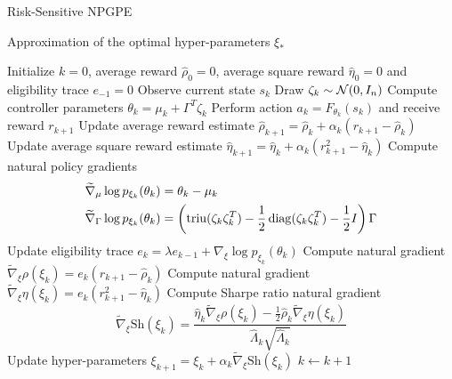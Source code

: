 \begin{algorithm}[t!]
	\caption{Risk-Sensitive NPGPE}
	\label{algo:RSNPGPE}
	\begin{algorithmic}[0]
		\Ensure Approximation of the optimal hyper-parameters $\xi_*$
		\begin{algorithmic}[1]
		\State Initialize $k = 0$, average reward $\widehat{\rho}_0 = 0$, average square reward $\widehat{\eta}_0 = 0$ and eligibility trace $e_{-1} = 0$
		\Repeat
			\State Observe current state $s_k$
			\State Draw $\zeta_k \sim \mathcal{N}(0, I_n)$
			\State Compute controller parameters $\theta_k = \mu_k + \Gamma^T \zeta_k$
			\State Perform action $a_k = F_{\theta_k}(s_k)$ and receive reward $r_{k+1}$
			\State Update average reward estimate $\widehat{\rho}_{k+1} = \widehat{\rho}_{k} + \alpha_k (r_{k+1} - \widehat{\rho}_{k})$
			\State Update average square reward estimate $\widehat{\eta}_{k+1} = \widehat{\eta}_{k} + \alpha_k (r_{k+1}^2 - \widehat{\eta}_{k})$
			\State Compute natural policy gradients
				\begin{equation*}
					\begin{split}
						\widetilde{\nabla}_\mu \log p_{\xi_k}(\theta_k) &= \theta_k - \mu_k\\
						\widetilde{\nabla}_\Gamma \log p_{\xi_k}(\theta_k) &= \left(\operatorname{triu}(\zeta_k \zeta_k^T) - \frac{1}{2} \operatorname{diag}(\zeta_k \zeta_k^T) - \frac{1}{2} I \right) \Gamma
					\end{split}
				\end{equation*}
			\State Update eligibility trace $e_{k} = \lambda e_{k-1} + \nabla_\xi \log p_{\xi_k}(\theta_k)$
			\State Compute natural gradient $\widetilde{\nabla}_\xi \rho(\xi_k) = e_k \left(r_{k+1} - \widehat{\rho}_{k}\right)$
			\State Compute natural gradient $\widetilde{\nabla}_\xi \eta(\xi_k) = e_k \left(r_{k+1}^2 - \widehat{\eta}_{k}\right)$
			\State Compute Sharpe ratio natural gradient
			\begin{equation*}
				\widetilde{\nabla}_\xi \text{Sh}(\xi_k) = \frac{\widehat{\eta}_{k} \widetilde{\nabla}_\xi \rho(\xi_k) - \frac{1}{2} \widehat{\rho}_{k} \widetilde{\nabla}_\xi \eta(\xi_k)}{\widehat{\Lambda}_k \sqrt{\widehat{\Lambda}_k}}
			\end{equation*}
			\State Update hyper-parameters $\xi_{k+1} = \xi_k + \alpha_k \widetilde{\nabla}_\xi \text{Sh}(\xi_k)$
			\State $k \leftarrow k + 1$
		\end{algorithmic}
	\end{algorithmic}
\end{algorithm}  
